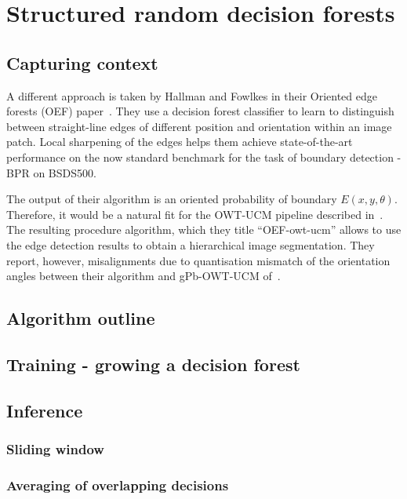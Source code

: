 \chapter{Structured random decision forests}
\label{Chapter3}
\section{Capturing context}
A different approach is taken by Hallman and Fowlkes in their Oriented edge forests (OEF) paper~\cite{Hallman2014}. They use a decision forest classifier to learn to distinguish between straight-line edges of different position and orientation within an image patch. Local sharpening of the edges helps them achieve state-of-the-art performance on the now standard benchmark for the task of boundary detection - BPR on BSDS500.

The output of their algorithm is an oriented probability of boundary $E(x,y,\theta)$. Therefore, it would be a natural fit for the OWT-UCM pipeline described in~\cite{Arbelaez11}. The resulting procedure algorithm, which they title ``OEF-owt-ucm'' allows to use the edge detection results to obtain a hierarchical image segmentation. They report, however, misalignments due to quantisation mismatch of the orientation angles between their algorithm and gPb-OWT-UCM of~\cite{Arbelaez11}.

\section{Algorithm outline}
\section{Training - growing a decision forest}
\section{Inference}
\subsection{Sliding window}
\subsection{Averaging of overlapping decisions}
